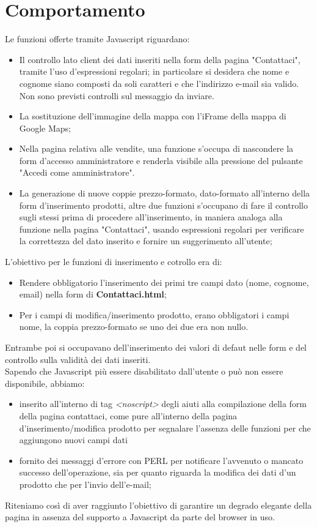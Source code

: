 \section{Comportamento}{
	Le funzioni offerte tramite Javascript riguardano: 
	\begin{itemize}\itemsep1pt
		\item Il controllo lato client dei dati inseriti nella form della pagina "Contattaci", tramite l'uso d'espressioni regolari; in particolare si desidera che nome e cognome siano composti da soli caratteri e che l'indirizzo e-mail sia valido. Non sono previsti controlli sul messaggio da inviare.
		\item La sostituzione dell'immagine della mappa con l'iFrame della mappa di Google Maps;
		\item Nella pagina relativa alle vendite, una funzione s'occupa di nascondere la form d'accesso amministratore e renderla visibile alla pressione del pulsante "Accedi come amministratore".
		\item La generazione di nuove coppie prezzo-formato, dato-formato all'interno della form d'inserimento prodotti, altre due funzioni s'occupano di fare il controllo sugli stessi prima di procedere all'inserimento, in maniera analoga alla funzione nella pagina "Contattaci", usando espressioni regolari per verificare la correttezza del dato inserito e fornire un suggerimento all'utente;
	\end{itemize}
	L'obiettivo per le funzioni di inserimento e cotrollo era di:
	\begin{itemize}\itemsep1pt
		\item Rendere obbligatorio l'inserimento dei primi tre campi dato (nome, cognome, email) nella form di \textbf{Contattaci.html};
		\item Per i campi di modifica/inserimento prodotto, erano obbligatori i campi nome, la coppia prezzo-formato se uno dei due era non nullo.
	\end{itemize}
	Entrambe poi si occupavano dell'inserimento dei valori di defaut nelle form e del controllo sulla validità dei dati inseriti.\\
	Sapendo che Javascript più essere disabilitato dall'utente o può non essere disponibile, abbiamo:
	\begin{itemize}\itemsep1pt
		\item inserito all'interno di tag \textit{<noscript>} degli aiuti alla compilazione della form della pagina contattaci, come pure all'interno della pagina d'inserimento/modifica prodotto per segnalare l'assenza delle funzioni per che aggiungono nuovi campi dati
		\item fornito dei messaggi d'errore con PERL per notificare l'avvenuto o mancato successo dell'operazione, sia per quanto riguarda la modifica dei dati d'un prodotto che per l'invio dell'e-mail;
	\end{itemize}
	Riteniamo così di aver raggiunto l'obiettivo di garantire un degrado elegante della pagina in assenza del supporto a Javascript da parte del browser in uso.
}